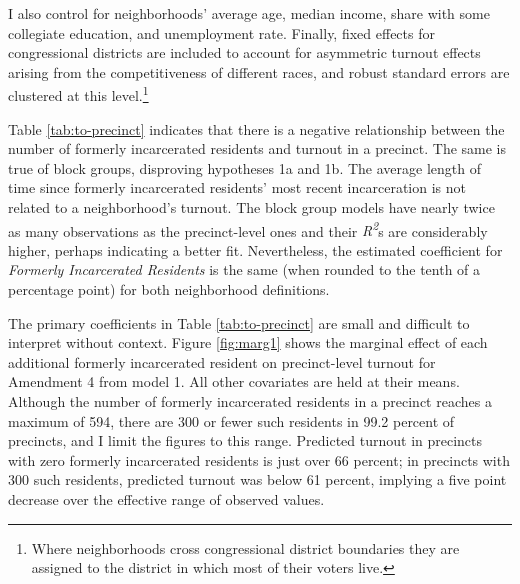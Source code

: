 \documentclass[
  12pt,
]{article}
\begin{document}
I also control for neighborhoods' average age, median income, share with some collegiate education, and unemployment rate. Finally, fixed effects for congressional districts are included to account for asymmetric turnout effects arising from the competitiveness of different races, and robust standard errors are clustered at this level.\footnote{Where neighborhoods cross congressional district boundaries they are assigned to the district in which most of their voters live.}

\begin{singlespace}


\end{singlespace}

Table \ref{tab:to-precinct} indicates that there is a negative relationship between the number of formerly incarcerated residents and turnout in a precinct. The same is true of block groups, disproving hypotheses 1a and 1b. The average length of time since formerly incarcerated residents' most recent incarceration is not related to a neighborhood's turnout. The block group models have nearly twice as many observations as the precinct-level ones and their \emph{R\textsuperscript{2}}s are considerably higher, perhaps indicating a better fit. Nevertheless, the estimated coefficient for \emph{Formerly Incarcerated Residents} is the same (when rounded to the tenth of a percentage point) for both neighborhood definitions.

The primary coefficients in Table \ref{tab:to-precinct} are small and difficult to interpret without context. Figure \ref{fig:marg1} shows the marginal effect of each additional formerly incarcerated resident on precinct-level turnout for Amendment 4 from model 1. All other covariates are held at their means. Although the number of formerly incarcerated residents in a precinct reaches a maximum of 594, there are 300 or fewer such residents in 99.2 percent of precincts, and I limit the figures to this range. Predicted turnout in precincts with zero formerly incarcerated residents is just over 66 percent; in precincts with 300 such residents, predicted turnout was below 61 percent, implying a five point decrease over the effective range of observed values.
\end{document}
